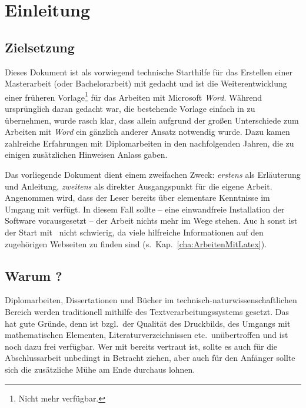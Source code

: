 \chapter{Einleitung}
\label{cha:Einleitung}

\section{Zielsetzung}
Dieses Dokument ist als vorwiegend technische Starthilfe für das
Erstellen einer Masterarbeit (oder Bachelorarbeit) mit \latex
gedacht und ist die Weiterentwicklung einer früheren
Vorlage\footnote{Nicht mehr verfügbar.} für das Arbeiten mit
Microsoft \emph{Word}. Während ursprünglich daran gedacht war, die
bestehende Vorlage einfach in \latex zu übernehmen, wurde rasch
klar, dass allein aufgrund der großen Unterschiede zum Arbeiten
mit \emph{Word} ein gänzlich anderer Ansatz notwendig wurde. Dazu
kamen zahlreiche Erfahrungen mit Diplomarbeiten in den
nachfolgenden Jahren, die zu einigen zusätzlichen Hinweisen Anlass gaben.

Das vorliegende Dokument dient einem zweifachen Zweck: 
\emph{erstens} als Erläuterung und Anleitung, \emph{zweitens} als
direkter Ausgangspunkt für die eigene Arbeit. Angenommen wird,
dass der Leser bereits über elementare Kenntnisse im Umgang mit
\latex verfügt. In diesem Fall sollte -- eine einwandfreie
Installation der Software vorausgesetzt -- der Arbeit nichts mehr
im Wege stehen. Auc                                                                                                                                                                                                                                                                                                      h sonst ist der Start mit \latex\ nicht
schwierig, da viele hilfreiche Informationen auf den zugehörigen
Webseiten zu finden sind (s.\ Kap.~\ref{cha:ArbeitenMitLatex}).





\section{Warum {\latex}?}

Diplomarbeiten, Dissertationen und Bücher im
technisch-natur\-wissen\-schaft\-lichen Bereich werden
traditionell mithilfe des Textverarbeitungssystems \latex
\cite{Lamport94,Lamport95} gesetzt. Das hat gute Gründe, denn
\latex ist bzgl.\ der Qualität des Druckbilds, des Umgangs mit
mathematischen Elementen, Literaturverzeichnissen etc.\
unübertroffen und ist noch dazu frei verfügbar. Wer mit \latex
bereits vertraut ist, sollte es auch für die Abschlussarbeit
unbedingt in Betracht ziehen, aber auch für den Anfänger sollte
sich die zusätzliche Mühe am Ende durchaus lohnen.

